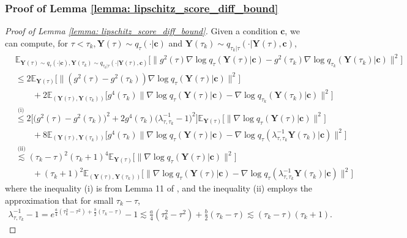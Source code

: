\documentclass[11pt]{article}
\newcommand{\mE}{\mathbb{E}}
\newcommand{\bY}{\mathbf{Y}}
\newcommand{\bc}{\mathbf{c}}
\begin{document}
\subsubsection{Proof of Lemma \ref{lemma: lipschitz_score_diff_bound}}\label{sec: lipschitz_score_diff_bound}


\begin{proof}[Proof of Lemma \ref{lemma: lipschitz_score_diff_bound}]
    Given a condition $\bc$, we can compute,  for $\tau < \tau_k, \bY(\tau)\sim q_\tau(\cdot | \bc)$ and $\bY(\tau_k)\sim q_{\tau_k | \tau}(\cdot | \bY(\tau), \bc)$,
\begin{align}
    & \mE_{\bY(\tau)\sim q_\tau(\cdot | \bc), \bY(\tau_k)\sim q_{\tau_k | \tau}(\cdot | \bY(\tau), \bc)}\big[\|g^2(\tau)\nabla\log q_\tau(\bY(\tau) | \bc) - g^2(\tau_k)\nabla\log q_{\tau_k}(\bY(\tau_k) | \bc)\|^2\big]\nonumber\\
    &\le 2\mE_{\bY(\tau)}\big[\|(g^2(\tau) - g^2(\tau_k))\nabla\log q_\tau(\bY(\tau) | \bc)\|^2] \nonumber\\
    &\qquad  + 2\mE_{(\bY(\tau), \bY(\tau_k))}\big[g^4(\tau_k)\|\nabla\log q_\tau(\bY(\tau) | \bc) - \nabla\log q_{\tau_k}(\bY(\tau_k) | \bc)\|^2\big]\nonumber\\
    &\overset{\text{(i)}}{\le} 2\big[\big(g^2(\tau) - g^2(\tau_k)\big)^2 + 2g^4(\tau_k)\big(\lambda_{\tau, \tau_k}^{-1} - 1\big)^2\big] \mE_{\bY(\tau)}\big[\|\nabla\log q_\tau(\bY(\tau) | \bc)\|^2]\nonumber\\
    &\qquad  + 8\mE_{(\bY(\tau), \bY(\tau_k))}\big[g^4(\tau_k)\|\nabla\log q_\tau(\bY(\tau) | \bc) - \nabla\log q_{\tau}(\lambda_{\tau, \tau_k}^{-1}\bY(\tau_k) | \bc)\|^2\big]\nonumber\\
    &\overset{\text{(ii)}}{\lesssim} (\tau_k - \tau)^2(\tau_k + 1)^4 \mE_{\bY(\tau)}\big[\|\nabla\log q_\tau(\bY(\tau) | \bc)\|^2]\nonumber\\
    &\qquad  + (\tau_k + 1)^2\mE_{(\bY(\tau), \bY(\tau_k))}\big[\|\nabla\log q_\tau(\bY(\tau) | \bc) - \nabla\log q_{\tau}(\lambda_{\tau, \tau_k}^{-1}\bY(\tau_k) | \bc)\|^2\big] \label{eq: score_error_target}
\end{align}
where the inequality (i) is from Lemma 11 of \cite{chen2023improved}, and the inequality (ii) employs the approximation that for small $\tau_k - \tau$,
\begin{align*}
    \lambda^{-1}_{\tau, \tau_k} - 1 = e^{\frac{a}{4}(\tau_k^2 - \tau^2) + \frac{b}{2}(\tau_k - \tau)} - 1\lesssim \frac{a}{4}(\tau_k^2 - \tau^2) + \frac{b}{2}(\tau_k - \tau) \lesssim (\tau_k - \tau)(\tau_k + 1).
\end{align*}


\end{proof}
\end{document}
